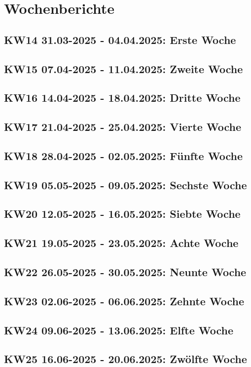 \section{Wochenberichte}
\subsection{KW14 31.03-2025 - 04.04.2025: Erste Woche}
\subsection{KW15 07.04-2025 - 11.04.2025: Zweite Woche}
\subsection{KW16 14.04-2025 - 18.04.2025: Dritte Woche}
\subsection{KW17 21.04-2025 - 25.04.2025: Vierte Woche}
\subsection{KW18 28.04-2025 - 02.05.2025: Fünfte Woche}
\subsection{KW19 05.05-2025 - 09.05.2025: Sechste Woche}
\subsection{KW20 12.05-2025 - 16.05.2025: Siebte Woche}
\subsection{KW21 19.05-2025 - 23.05.2025: Achte Woche}
\subsection{KW22 26.05-2025 - 30.05.2025: Neunte Woche}
\subsection{KW23 02.06-2025 - 06.06.2025: Zehnte Woche}
\subsection{KW24 09.06-2025 - 13.06.2025: Elfte Woche}
\subsection{KW25 16.06-2025 - 20.06.2025: Zwölfte Woche}
